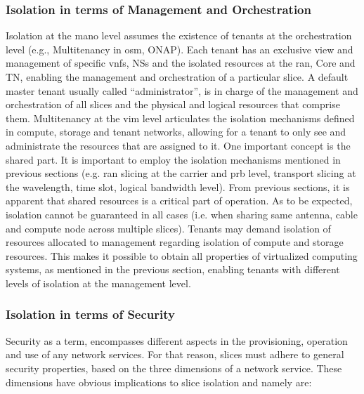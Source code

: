     \subsubsection{Isolation in terms of Management and Orchestration}
    \label{chap:isolation-mano}
    Isolation at the \acrshort{mano} level assumes the existence of tenants at the orchestration level (e.g., Multitenancy in \acrshort{osm}, ONAP). Each tenant has an exclusive view and management of specific \acrshort{vnf}s, NSs and the isolated resources at the \acrshort{ran}, Core and TN, enabling the management and orchestration of a particular slice. A default master tenant usually called “administrator”, is in charge of the management and orchestration of all slices and the physical and logical resources that comprise them.  Multitenancy at the \acrshort{vim} level articulates the isolation mechanisms defined in compute, storage and tenant networks, allowing for a tenant to only see and administrate the resources that are assigned to it.
    One important concept is the shared part. It is important to employ the isolation mechanisms mentioned in previous sections (e.g. \acrshort{ran} slicing at the carrier and \acrshort{prb} level, transport slicing at the wavelength, time slot, logical bandwidth level). From previous sections, it is apparent that shared resources is a critical part of operation. As to be expected, isolation cannot be guaranteed in all cases (i.e. when sharing same antenna, cable and compute node across multiple slices). Tenants may demand isolation of resources allocated to management regarding isolation of compute and storage resources. This makes it possible to obtain all properties of virtualized computing systems, as mentioned in the previous section, enabling tenants with different levels of isolation at the management level.

    \subsubsection{Isolation in terms of Security}
    \label{chap:isolation-security}
    Security as a term, encompasses different aspects in the provisioning, operation and use of any network services. For that reason, slices must adhere to general security properties, based on the three dimensions of a network service. These dimensions have obvious implications to slice isolation and namely are:
    
